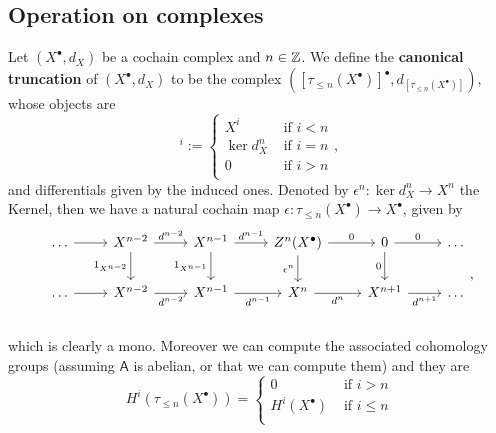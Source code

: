 \subsection{Operation on complexes}
\begin{defn}
	Let $\left( X^{\bullet}, d_{X} \right)$ be a cochain complex and $n \in \mathbb{Z}$.
	We define the \textbf{canonical truncation} of $\left( X^{\bullet}, d_{X} \right)$ to be the complex
	$\left( [\tau_{\leq n}(X^\bullet)]^{\bullet}, d_{[\tau_{\leq n}(X^\bullet)]} \right)$, whose objects are
	\begin{equation}
		[\tau_{\leq n}(X^\bullet)]^i := 
	\begin{cases}
		X^i & \text{ if } i < n\\
		\ker d_X^n & \text{ if } i = n\\
		0 & \text{ if } i > n\\
	\end{cases} 
	,\end{equation} 
	and differentials given by the induced ones.
	Denoted by $\epsilon^n: \ker d^n_X \to X^n$ the Kernel, then we have a
	natural cochain map $\epsilon: \tau_{\leq n}(X^\bullet) \to X^\bullet$, given by
	\begin{equation}
	\begin{tikzcd}
		\ldots \arrow[r, "", rightarrow] &
		X^{n-2} \arrow[r, "d^{n-2}", rightarrow] \arrow[d, "1_{X^{n-2}}"', rightarrow] &
		X^{n-1} \arrow[r, "d^{n-1}", rightarrow] \arrow[d, "1_{X^{n-1}}"', rightarrow] &
		Z^{n}(X^\bullet) \arrow[r, "0", rightarrow] \arrow[d, "\epsilon^{n}"', rightarrow] &
		0 \arrow[r, "0", rightarrow] \arrow[d, "0"', rightarrow] &
		\ldots \\
		\ldots \arrow[r, "", rightarrow] &
		X^{n-2} \arrow[r, "d^{n-2}"', rightarrow] &
		X^{n-1} \arrow[r, "d^{n-1}"', rightarrow] &
		X^{n} \arrow[r, "d^{n}"', rightarrow] &
		X^{n+1} \arrow[r, "d^{n+1}"', rightarrow] &
		\ldots \\
	\end{tikzcd}
	,\end{equation} 
	which is clearly a mono.
	Moreover we can compute the associated cohomology groups (assuming $\mathsf{A}$ is abelian, or that we can compute them)
	and they are
	\begin{equation}
		H^i \left( \tau_{\leq n}(X^\bullet) \right) =
		\begin{cases}
			0 & \text{ if } i > n\\
			H^i(X^\bullet) & \text{ if } i \leq n\\
		\end{cases} 

\end{equation}
\end{defn}
